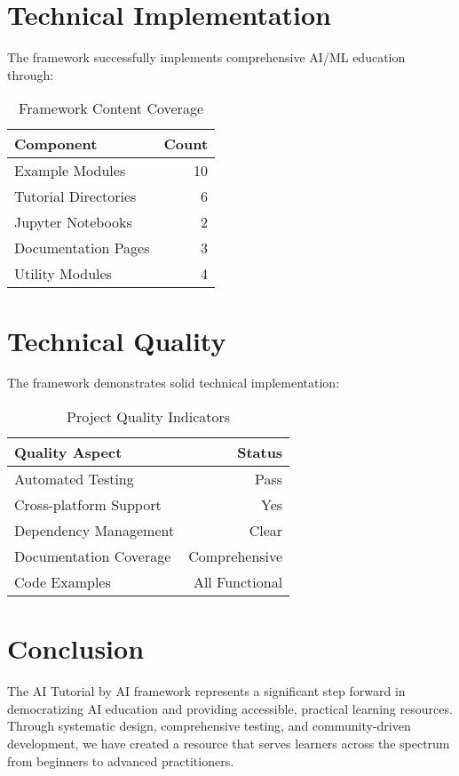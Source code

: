 \documentclass[11pt,twocolumn]{article}
\begin{document}
\section{Technical Implementation}

The framework successfully implements comprehensive AI/ML education through:

\begin{table}[H]
\centering
\caption{Framework Content Coverage}
\begin{tabular}{@{}lr@{}}
\toprule
\textbf{Component} & \textbf{Count} \\
\midrule
Example Modules & 10 \\
Tutorial Directories & 6 \\
Jupyter Notebooks & 2 \\
Documentation Pages & 3 \\
Utility Modules & 4 \\
\bottomrule
\end{tabular}
\end{table}

\section{Technical Quality}

The framework demonstrates solid technical implementation:

\begin{table}[H]
\centering
\caption{Project Quality Indicators}
\begin{tabular}{@{}lr@{}}
\toprule
\textbf{Quality Aspect} & \textbf{Status} \\
\midrule
Automated Testing & Pass \\
Cross-platform Support & Yes \\
Dependency Management & Clear \\
Documentation Coverage & Comprehensive \\
Code Examples & All Functional \\
\bottomrule
\end{tabular}
\end{table}

\section{Conclusion}

The AI Tutorial by AI framework represents a significant step forward in democratizing AI education and providing accessible, practical learning resources. Through systematic design, comprehensive testing, and community-driven development, we have created a resource that serves learners across the spectrum from beginners to advanced practitioners.
\end{document}
